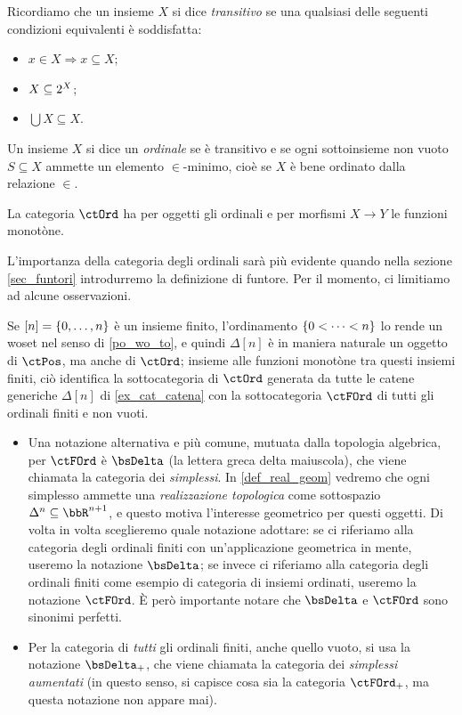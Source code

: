 \begin{example}\label{ex_cat_ordinali}
	Ricordiamo che un insieme \(X\) si dice \emph{transitivo} se una qualsiasi delle seguenti condizioni equivalenti è soddisfatta:
	\begin{itemize}
		\item \(x\in X\Rightarrow x\subseteq X\);
		\item \(X\subseteq 2^{X}\);
		\item \(\bigcup X\subseteq X\).
	\end{itemize}
	Un insieme \(X\) si dice un \emph{ordinale} se è transitivo e se ogni sottoinsieme non vuoto \(S\subseteq X\) ammette un elemento \(\in\)-minimo, cioè se \(X\) è bene ordinato dalla relazione \(\in\).

	La categoria \(\ctOrd\) ha per oggetti gli ordinali e per morfismi \(X\to Y\) le funzioni monotòne.
\end{example}
L'importanza della categoria degli ordinali sarà più evidente quando nella sezione \ref{sec_funtori} introdurremo la definizione di funtore. Per il momento, ci limitiamo ad alcune osservazioni.
\begin{remark}\label{rmk_delta_e_deltaPlus}
	Se \([n]=\{\iter[0] n\}\) è un insieme finito, l'ordinamento \(\{\iter[0][<]n\}\) lo rende un woset nel senso di \ref{po_wo_to}, e quindi \(\Delta[n]\) è in maniera naturale un oggetto di \(\ctPos\), ma anche di \(\ctOrd\); insieme alle funzioni monotòne tra questi insiemi finiti, ciò identifica la sottocategoria di \(\ctOrd\) generata da tutte le catene generiche \(\Delta[n]\) di \ref{ex_cat_catena} con la sottocategoria \(\ctFOrd\) di tutti gli ordinali finiti e non vuoti.
	\begin{itemize}
		\item Una notazione alternativa e più comune, mutuata dalla topologia algebrica, per \(\ctFOrd\)	è \(\bsDelta\) (la lettera greca delta maiuscola), che viene chiamata la categoria dei \emph{simplessi}. In \ref{def_real_geom} vedremo che ogni simplesso ammette una \emph{realizzazione topologica} come sottospazio \(\Delta^n\subseteq\bbR^{n+1}\), e questo motiva l'interesse geometrico per questi oggetti. Di volta in volta sceglieremo quale notazione adottare: se ci riferiamo alla categoria degli ordinali finiti con un'applicazione geometrica in mente, useremo la notazione \(\bsDelta\); se invece ci riferiamo alla categoria degli ordinali finiti come esempio di categoria di insiemi ordinati, useremo la notazione \(\ctFOrd\). \`E però importante notare che \(\bsDelta\) e \(\ctFOrd\) sono sinonimi perfetti.
		\item Per la categoria di \emph{tutti} gli ordinali finiti, anche quello vuoto, si usa la notazione \(\bsDelta_+\), che viene chiamata la categoria dei \emph{simplessi aumentati} (in questo senso, si capisce cosa sia la categoria \(\ctFOrd_+\), ma questa notazione non appare mai).
	\end{itemize}
\end{remark}
